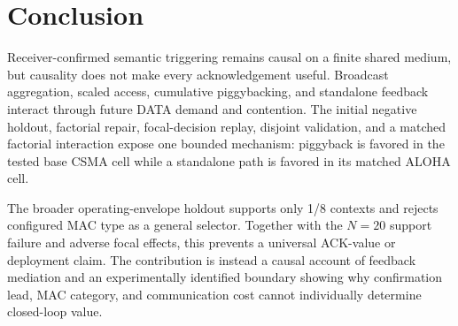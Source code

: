 \section{Conclusion}
\label{sec:s2-conclusion}

Receiver-confirmed semantic triggering remains causal on a finite shared
medium, but causality does not make every acknowledgement useful. Broadcast
aggregation, scaled access, cumulative piggybacking, and standalone feedback
interact through future DATA demand and contention. The initial negative
holdout, factorial repair, focal-decision replay, disjoint validation, and a
matched factorial interaction expose one bounded mechanism: piggyback is
favored in the tested base CSMA cell while a standalone path is favored in its
matched ALOHA cell.

The broader operating-envelope holdout supports only 1/8 contexts and rejects
configured MAC type as a general selector. Together with the $N=20$ support
failure and adverse focal effects, this prevents a universal ACK-value or
deployment claim. The contribution is instead a causal account of feedback
mediation and an experimentally identified boundary showing why confirmation
lead, MAC category, and communication cost cannot individually determine
closed-loop value.
